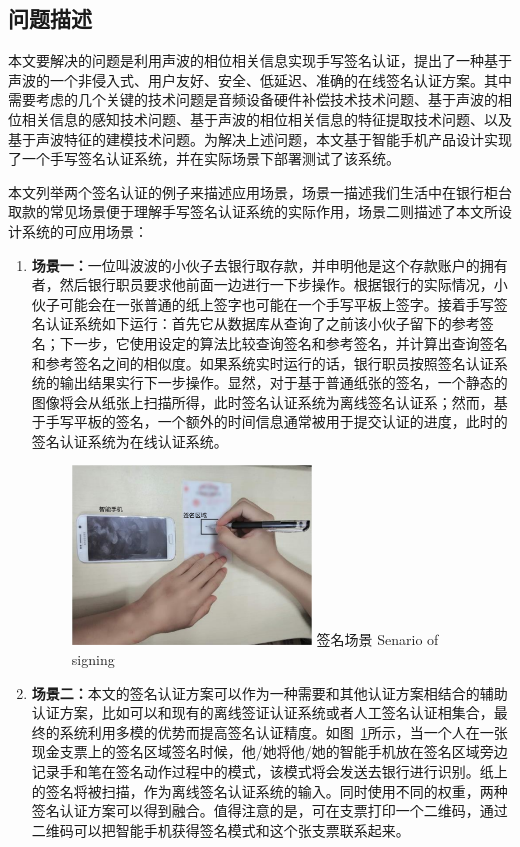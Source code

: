 \subsection{问题描述}
本文要解决的问题是利用声波的相位相关信息实现手写签名认证，提出了一种基于声波的一个非侵入式、用户友好、安全、低延迟、准确的在线签名认证方案。其中需要考虑的几个关键的技术问题是音频设备硬件补偿技术技术问题、基于声波的相位相关信息的感知技术问题、基于声波的相位相关信息的特征提取技术问题、以及基于声波特征的建模技术问题。为解决上述问题，本文基于智能手机产品设计实现了一个手写签名认证系统，并在实际场景下部署测试了该系统。

本文列举两个签名认证的例子来描述应用场景，场景一描述我们生活中在银行柜台取款的常见场景便于理解手写签名认证系统的实际作用，场景二则描述了本文所设计系统的可应用场景：
\begin{enumerate}[label=(\arabic*)]
\item \textbf{场景一：}一位叫波波的小伙子去银行取存款，并申明他是这个存款账户的拥有者，然后银行职员要求他前面一边进行一下步操作。根据银行的实际情况，小伙子可能会在一张普通的纸上签字也可能在一个手写平板上签字。接着手写签名认证系统如下运行：首先它从数据库从查询了之前该小伙子留下的参考签名；下一步，它使用设定的算法比较查询签名和参考签名，并计算出查询签名和参考签名之间的相似度。如果系统实时运行的话，银行职员按照签名认证系统的输出结果实行下一步操作。显然，对于基于普通纸张的签名，一个静态的图像将会从纸张上扫描所得，此时签名认证系统为离线签名认证系；然而，基于手写平板的签名，一个额外的时间信息通常被用于提交认证的进度，此时的签名认证系统为在线认证系统。

\begin{figure}[!htp]
  \centering
  \includegraphics[width=0.6\textwidth]{figure/acoustic-senario.pdf}
  \bicaption
    {签名场景}
    {Senario of signing}
  \label{fig:sign-senario}
\end{figure}

\item  \textbf{场景二：}本文的签名认证方案可以作为一种需要和其他认证方案相结合的辅助认证方案，比如可以和现有的离线签证认证系统或者人工签名认证相集合，最终的系统利用多模的优势而提高签名认证精度。如图~\ref{fig:sign-senario}所示，当一个人在一张现金支票上的签名区域签名时候，他/她将他/她的智能手机放在签名区域旁边记录手和笔在签名动作过程中的模式，该模式将会发送去银行进行识别。纸上的签名将被扫描，作为离线签名认证系统的输入。同时使用不同的权重，两种签名认证方案可以得到融合。值得注意的是，可在支票打印一个二维码，通过二维码可以把智能手机获得签名模式和这个张支票联系起来。
\end{enumerate}

